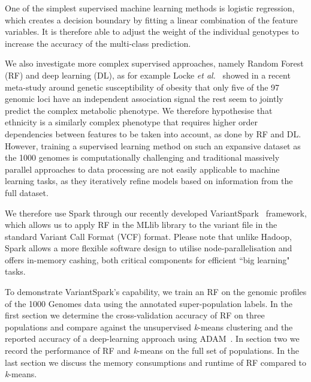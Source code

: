 \documentclass{llncs}
\newcommand{\variantSpark}{{\sc VariantSpark}}
\newcommand{\kMeans}{\textit{k}-means}
\begin{document}
{%
One of the simplest supervised machine learning methods is logistic regression, which creates a decision boundary by fitting a linear combination of the feature variables. 
It is therefore able to adjust the weight of the individual genotypes to increase the accuracy of the multi-class prediction.    



We also investigate more complex supervised approaches, namely Random Forest (RF) and deep learning (DL), as for example Locke {\it et al.}~\cite{Locke2015} showed in a recent meta-study around genetic susceptibility of obesity that only five of the 97 genomic loci have an independent association signal the rest seem to jointly predict the complex metabolic phenotype. 
We therefore hypothesise that ethnicity is a similarly complex phenotype that requires higher order dependencies between features to be taken into account, as done by RF and DL.
However, training a supervised learning method on such an expansive dataset as the 1000 genomes is computationally challenging and traditional massively parallel approaches to data processing are not easily applicable to machine learning tasks, as they iteratively refine models based on information from the full dataset. 

We therefore use {\sc Spark} through our recently developed \variantSpark~\cite{OBrien} framework, which allows us to apply RF in the MLlib library to the variant file in the standard Variant Call Format (VCF) format. 
Please note that unlike {\sc Hadoop}, {\sc Spark} allows a more flexible software design to utilise node-parallelisation and offers in-memory cashing, both critical components for efficient ``big learning" tasks. 

To demonstrate \variantSpark's capability, we train an RF on the genomic profiles of the 1000 Genomes data using the annotated super-population labels. 
In the first section we determine the cross-validation accuracy of RF on three populations and compare against the unsupervised \kMeans{} clustering and the reported accuracy of a deep-learning approach using {\sc ADAM}~\cite{Massie2013}.
In section two we record the performance of RF and \kMeans{} on the full set of populations. 
In the last section we discuss the memory consumptions and runtime of RF compared to \kMeans{}.


}
\end{document}
